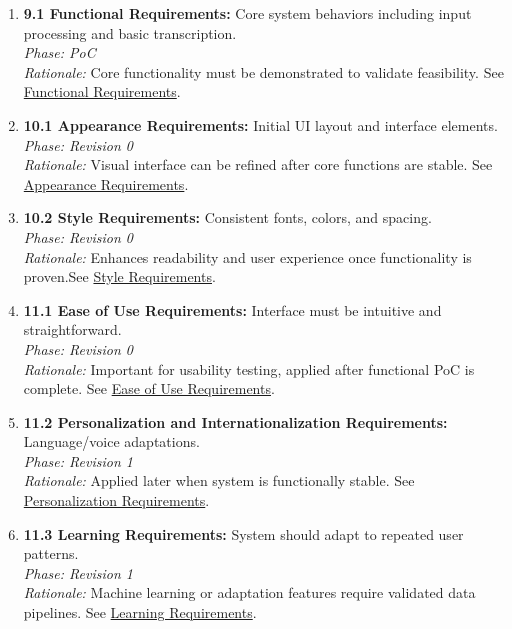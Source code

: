 \documentclass[11pt]{article}
\begin{document}
\begin{enumerate}
    \item \textbf{9.1 Functional Requirements:} Core system behaviors including input processing and basic transcription.\\
    \textit{Phase: PoC} \\
    \textit{Rationale:} Core functionality must be demonstrated to validate feasibility. See \hyperref[sec:FR]{Functional Requirements}.

    \item \textbf{10.1 Appearance Requirements:} Initial UI layout and interface elements.\\
    \textit{Phase: Revision 0} \\
    \textit{Rationale:} Visual interface can be refined after core functions are stable. See \hyperref[subsec:appearance]{Appearance Requirements}.

    \item \textbf{10.2 Style Requirements:} Consistent fonts, colors, and spacing.\\
    \textit{Phase: Revision 0} \\
    \textit{Rationale:} Enhances readability and user experience once functionality is proven.See \hyperref[subsec:style]{Style Requirements}.

    \item \textbf{11.1 Ease of Use Requirements:} Interface must be intuitive and straightforward.\\
    \textit{Phase: Revision 0} \\
    \textit{Rationale:} Important for usability testing, applied after functional PoC is complete. See \hyperref[subsec:ease-of-use]{Ease of Use Requirements}.

    \item \textbf{11.2 Personalization and Internationalization Requirements:} Language/voice adaptations.\\
    \textit{Phase: Revision 1} \\
    \textit{Rationale:} Applied later when system is functionally stable. See \hyperref[subsec:personalization]{Personalization Requirements}.

    \item \textbf{11.3 Learning Requirements:} System should adapt to repeated user patterns.\\
    \textit{Phase: Revision 1} \\
    \textit{Rationale:} Machine learning or adaptation features require validated data pipelines. See \hyperref[subsec:learning]{Learning Requirements}.


\end{enumerate}
\end{document}

